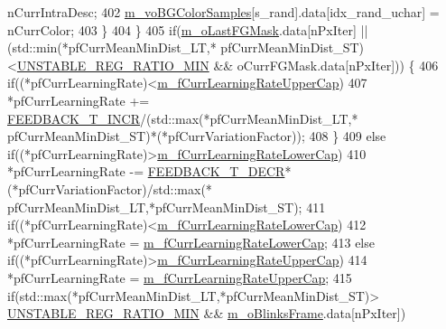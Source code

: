 \begin{DoxyCode}
      nCurrIntraDesc;
402                     \mbox{\hyperlink{class_background_subtractor_su_b_s_e_n_s_e_a9d4d4bb930b34745536b9862683bb539}{m\_voBGColorSamples}}[s\_rand].data[idx\_rand\_uchar] = nCurrColor;
403                 \}
404             \}
405             \textcolor{keywordflow}{if}(\mbox{\hyperlink{class_background_subtractor_l_b_s_p_adb6dc0af596c5592c91f9d8faa5c8a4b}{m\_oLastFGMask}}.data[nPxIter] || (std::min(*pfCurrMeanMinDist\_LT,*
      pfCurrMeanMinDist\_ST)<\mbox{\hyperlink{_background_subtractor_su_b_s_e_n_s_e_8cpp_acaad1bde74ca3c5a5c43c0e8deea2313}{UNSTABLE\_REG\_RATIO\_MIN}} && oCurrFGMask.data[nPxIter])) \{
406                 \textcolor{keywordflow}{if}((*pfCurrLearningRate)<\mbox{\hyperlink{class_background_subtractor_su_b_s_e_n_s_e_a44ba1a1ed365c5829baa517ce9f27508}{m\_fCurrLearningRateUpperCap}})
407                     *pfCurrLearningRate += \mbox{\hyperlink{_background_subtractor_su_b_s_e_n_s_e_8cpp_afa487dca8c1f4ae73e03567566465382}{FEEDBACK\_T\_INCR}}/(std::max(*pfCurrMeanMinDist\_LT,*
      pfCurrMeanMinDist\_ST)*(*pfCurrVariationFactor));
408             \}
409             \textcolor{keywordflow}{else} \textcolor{keywordflow}{if}((*pfCurrLearningRate)>\mbox{\hyperlink{class_background_subtractor_su_b_s_e_n_s_e_a57fdd29e43afc163233e55f9a7cd9f37}{m\_fCurrLearningRateLowerCap}})
410                 *pfCurrLearningRate -= \mbox{\hyperlink{_background_subtractor_su_b_s_e_n_s_e_8cpp_aeb1e65c4ebe34d91c849054de1951361}{FEEDBACK\_T\_DECR}}*(*pfCurrVariationFactor)/std::max(*
      pfCurrMeanMinDist\_LT,*pfCurrMeanMinDist\_ST);
411             \textcolor{keywordflow}{if}((*pfCurrLearningRate)<\mbox{\hyperlink{class_background_subtractor_su_b_s_e_n_s_e_a57fdd29e43afc163233e55f9a7cd9f37}{m\_fCurrLearningRateLowerCap}})
412                 *pfCurrLearningRate = \mbox{\hyperlink{class_background_subtractor_su_b_s_e_n_s_e_a57fdd29e43afc163233e55f9a7cd9f37}{m\_fCurrLearningRateLowerCap}};
413             \textcolor{keywordflow}{else} \textcolor{keywordflow}{if}((*pfCurrLearningRate)>\mbox{\hyperlink{class_background_subtractor_su_b_s_e_n_s_e_a44ba1a1ed365c5829baa517ce9f27508}{m\_fCurrLearningRateUpperCap}})
414                 *pfCurrLearningRate = \mbox{\hyperlink{class_background_subtractor_su_b_s_e_n_s_e_a44ba1a1ed365c5829baa517ce9f27508}{m\_fCurrLearningRateUpperCap}};
415             \textcolor{keywordflow}{if}(std::max(*pfCurrMeanMinDist\_LT,*pfCurrMeanMinDist\_ST)>
      \mbox{\hyperlink{_background_subtractor_su_b_s_e_n_s_e_8cpp_acaad1bde74ca3c5a5c43c0e8deea2313}{UNSTABLE\_REG\_RATIO\_MIN}} && \mbox{\hyperlink{class_background_subtractor_su_b_s_e_n_s_e_a943b50c63d233c0948d82b64390f1aa1}{m\_oBlinksFrame}}.data[nPxIter])

\end{DoxyCode}
